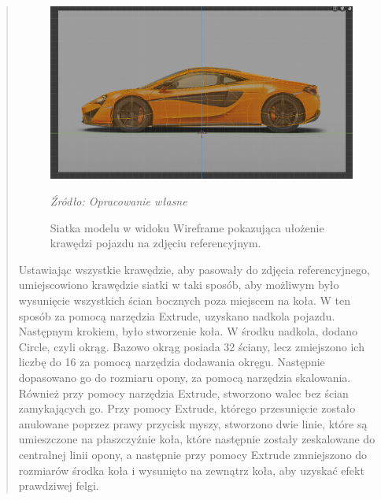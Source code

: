 \begin{quotation}
\begin{figure}[!hbt]
\centering
  \includegraphics[width=1\linewidth]{ksztalt.png}
  \caption{Siatka modelu w widoku Wireframe pokazująca ułożenie krawędzi pojazdu na zdjęciu referencyjnym.}\label{rys_10}
  \begin{minipage}[t]{0.75\linewidth}
    \emph{Źródło: Opracowanie własne}
  \end{minipage}
\end{figure}

\newpage
\indent Ustawiając wszystkie krawędzie, aby pasowały do zdjęcia referencyjnego, umiejscowiono krawędzie siatki w taki sposób, aby możliwym było wysunięcie wszystkich ścian bocznych poza miejscem na koła. W ten sposób za pomocą narzędzia Extrude, uzyskano nadkola pojazdu. Następnym krokiem, było stworzenie koła. W środku nadkola, dodano Circle, czyli okrąg. Bazowo okrąg posiada 32 ściany, lecz zmiejszono ich liczbę do 16 za pomocą narzędzia dodawania okręgu. Następnie dopasowano go do rozmiaru opony, za pomocą narzędzia skalowania. Również przy pomocy narzędzia Extrude, stworzono walec bez ścian zamykających go. Przy pomocy Extrude, którego przesunięcie zostało anulowane poprzez prawy przycisk myszy, stworzono dwie linie, które są umieszczone na płaszczyźnie koła, które następnie zostały zeskalowane do centralnej linii opony, a następnie przy pomocy Extrude zmniejszono do rozmiarów środka koła i wysunięto na zewnątrz koła, aby uzyskać efekt prawdziwej felgi. 


\end{quotation}
